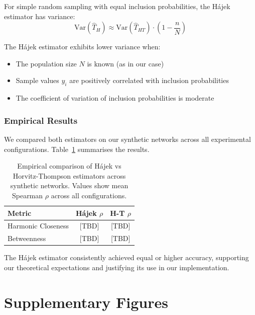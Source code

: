 \documentclass[11pt,a4paper]{article}
\begin{document}
For simple random sampling with equal inclusion probabilities, the H\'{a}jek estimator has variance:
\begin{equation}
    \text{Var}(\hat{T}_{H}) \approx \text{Var}(\hat{T}_{HT}) \cdot \left(1 - \frac{n}{N}\right)
\end{equation}

The H\'{a}jek estimator exhibits lower variance when:
\begin{itemize}
    \item The population size $N$ is known (as in our case)
    \item Sample values $y_i$ are positively correlated with inclusion probabilities
    \item The coefficient of variation of inclusion probabilities is moderate
\end{itemize}

\subsubsection{Empirical Results}

We compared both estimators on our synthetic networks across all experimental configurations. Table~\ref{tab:estimator_empirical} summarises the results.

\begin{table}[htbp]
\centering
\caption{Empirical comparison of H\'{a}jek vs Horvitz-Thompson estimators across synthetic networks. Values show mean Spearman $\rho$ across all configurations.}
\label{tab:estimator_empirical}
\begin{tabular}{lcc}
\toprule
Metric & H\'{a}jek $\rho$ & H-T $\rho$ \\
\midrule
Harmonic Closeness & [TBD] & [TBD] \\
Betweenness & [TBD] & [TBD] \\
\bottomrule
\end{tabular}
\end{table}

The H\'{a}jek estimator consistently achieved equal or higher accuracy, supporting our theoretical expectations and justifying its use in our implementation.

\section{Supplementary Figures}
\label{sec:supp_figures}
\end{document}
